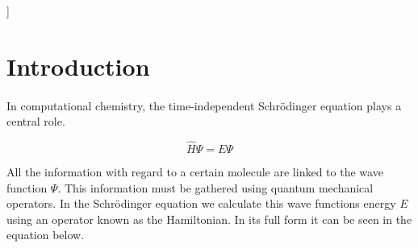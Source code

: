 \documentclass[twoside,twocolumn,9pt]{article}
\begin{document}
]

\renewcommand*\rmdefault{bch}\normalfont\upshape
\rmfamily
\section*{}
\vspace{-1cm}










\section{Introduction}

\paragraph*{}
In computational chemistry, the time-independent Schrödinger equation plays a central role.

\begin{equation}\label{eq:erwin}
  \hat{H}\Psi = E\Psi
\end{equation}

All the information with regard to a certain molecule are linked to the wave function $\Psi$.
This information must be gathered using quantum mechanical operators. In the Schrödinger equation we
calculate this wave functions energy $E$ using an operator known as the Hamiltonian. In its full form it can be seen in the equation below\cite{Szabo1996}.
\end{document}
